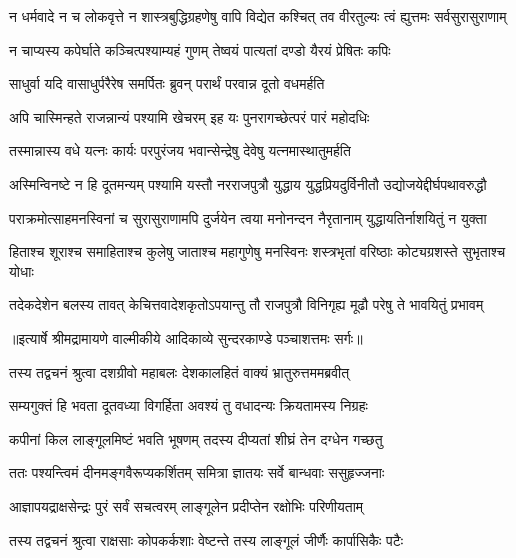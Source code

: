 \fourlineindentedshloka
{न धर्मवादे न च लोकवृत्ते}
{न शास्त्रबुद्धिग्रहणेषु वापि}
{विद्येत कश्चित् तव वीरतुल्यः}
{त्वं ह्युत्तमः सर्वसुरासुराणाम्} %

\twolineshloka
{न चाप्यस्य कपेर्घाते कञ्चित्पश्याम्यहं गुणम्}
{तेष्वयं पात्यतां दण्डो यैरयं प्रेषितः कपिः} %

\twolineshloka
{साधुर्वा यदि वासाधुर्परैरेष समर्पितः}
{ब्रुवन् परार्थं परवान्न दूतो वधमर्हति} %

\twolineshloka
{अपि चास्मिन्हते राजन्नान्यं पश्यामि खेचरम्}
{इह यः पुनरागच्छेत्परं पारं महोदधिः} %

\twolineshloka
{तस्मान्नास्य वधे यत्नः कार्यः परपुरंजय}
{भवान्सेन्द्रेषु देवेषु यत्नमास्थातुमर्हति} %

\fourlineindentedshloka
{अस्मिन्विनष्टे न हि दूतमन्यम्}
{पश्यामि यस्तौ नरराजपुत्रौ}
{युद्धाय युद्धप्रियदुर्विनीतौ}
{उद्योजयेद्दीर्घपथावरुद्धौ} %

\fourlineindentedshloka
{पराक्रमोत्साहमनस्विनां च}
{सुरासुराणामपि दुर्जयेन}
{त्वया मनोनन्दन नैरृतानाम्}
{युद्धायतिर्नाशयितुं न युक्ता} %

\fourlineindentedshloka
{हिताश्च शूराश्च समाहिताश्च}
{कुलेषु जाताश्च महागुणेषु}
{मनस्विनः शस्त्रभृतां वरिष्ठाः}
{कोट्यग्रशस्ते सुभृताश्च योधाः} %

\fourlineindentedshloka
{तदेकदेशेन बलस्य तावत्}
{केचित्तवादेशकृतोऽपयान्तु}
{तौ राजपुत्रौ विनिगृह्य मूढौ}
{परेषु ते भावयितुं प्रभावम्} %


{॥इत्यार्षे श्रीमद्रामायणे वाल्मीकीये आदिकाव्ये सुन्दरकाण्डे पञ्चाशत्तमः सर्गः॥}


\twolineshloka
{तस्य तद्वचनं श्रुत्वा दशग्रीवो महाबलः}
{देशकालहितं वाक्यं भ्रातुरुत्तममब्रवीत्} %

\twolineshloka
{सम्यगुक्तं हि भवता दूतवध्या विगर्हिता}
{अवश्यं तु वधादन्यः क्रियतामस्य निग्रहः} %

\twolineshloka
{कपीनां किल लाङ्गूलमिष्टं भवति भूषणम्}
{तदस्य दीप्यतां शीघ्रं तेन दग्धेन गच्छतु} %

\twolineshloka
{ततः पश्यन्त्विमं दीनमङ्गवैरूप्यकर्शितम्}
{समित्रा ज्ञातयः सर्वे बान्धवाः ससुहृज्जनाः} %

\twolineshloka
{आज्ञापयद्राक्षसेन्द्रः पुरं सर्वं सचत्वरम्}
{लाङ्गूलेन प्रदीप्तेन रक्षोभिः परिणीयताम्} %

\twolineshloka
{तस्य तद्वचनं श्रुत्वा राक्षसाः कोपकर्कशाः}
{वेष्टन्ते तस्य लाङ्गूलं जीर्णैः कार्पासिकैः पटैः} %

